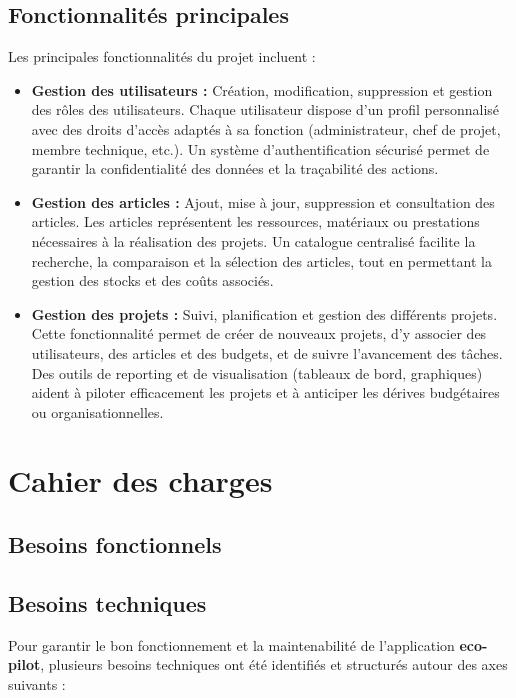 \documentclass[12pt,a4paper]{report}
\begin{document}
\section{Fonctionnalités principales}
Les principales fonctionnalités du projet incluent :
\begin{itemize}
    \item \textbf{Gestion des utilisateurs :} Création, modification, suppression et gestion des rôles des utilisateurs. Chaque utilisateur dispose d’un profil personnalisé avec des droits d’accès adaptés à sa fonction (administrateur, chef de projet, membre technique, etc.). Un système d’authentification sécurisé permet de garantir la confidentialité des données et la traçabilité des actions.
    \item \textbf{Gestion des articles :} Ajout, mise à jour, suppression et consultation des articles. Les articles représentent les ressources, matériaux ou prestations nécessaires à la réalisation des projets. Un catalogue centralisé facilite la recherche, la comparaison et la sélection des articles, tout en permettant la gestion des stocks et des coûts associés.
    \item \textbf{Gestion des projets :} Suivi, planification et gestion des différents projets. Cette fonctionnalité permet de créer de nouveaux projets, d’y associer des utilisateurs, des articles et des budgets, et de suivre l’avancement des tâches. Des outils de reporting et de visualisation (tableaux de bord, graphiques) aident à piloter efficacement les projets et à anticiper les dérives budgétaires ou organisationnelles.
\end{itemize}

\chapter{Cahier des charges}
\section{Besoins fonctionnels}
\section{Besoins techniques}

Pour garantir le bon fonctionnement et la maintenabilité de l’application \textbf{eco-pilot}, plusieurs besoins techniques ont été identifiés et structurés autour des axes suivants :
\end{document}
